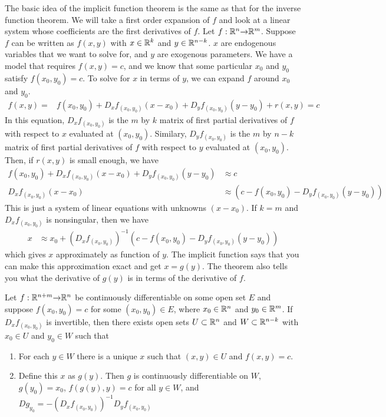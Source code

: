 The basic idea of the implicit function theorem is the same as that
for the inverse function theorem. We will take a first order expansion
of $f$ and look at a linear system whose coefficients are the first
derivatives of $f$. Let $f: \mathbb{R}^n {\rightarrow} \mathbb{R}^m$. Suppose $f$ can be written
as $f(x,y)$ with $x \in \mathbb{R}^k$ and $y \in \mathbb{R}^{n-k}$. $x$ are endogenous
variables that we want to solve for, and $y$ are exogenous
parameters. We have a model that requires $f(x,y) = c$, and we know
that some particular $x_0$ and $y_0$ satisfy $f(x_0,y_0) = c$. To
solve for $x$ in terms of $y$, we can expand $f$ around $x_0$ and
$y_0$. 
\begin{align*}
  f(x,y) = & f(x_0,y_0) + D_xf_{(x_0,y_0)} (x-x_0) + D_yf_{(x_0,y_0)}
  (y-y_0) + r(x,y) = c 
\end{align*}
In this equation, $D_xf_{(x_0,y_0)}$ is the $m$ by $k$ matrix of first
partial derivatives of $f$ with respect to $x$ evaluated at
$(x_0,y_0)$. Similary,  $D_yf_{(x_0,y_0)}$ is the $m$ by $n-k$ matrix of first
partial derivatives of $f$ with respect to $y$ evaluated at
$(x_0,y_0)$.  Then, if $r(x,y)$ is small enough, we have
\begin{align*}
  f(x_0,y_0) + D_xf_{(x_0,y_0)} (x-x_0) + D_yf_{(x_0,y_0)}
 (y-y_0) & \approx c \\
 D_xf_{(x_0,y_0)} (x-x_0) & \approx \left(c -  f(x_0,y_0) -
   D_yf_{(x_0,y_0)} (y-y_0)\right) 
\end{align*}
This is just a system of linear equations with unknowns $(x-x_0)$. If
$k=m$ and $D_xf_{(x_0,y_0)}$ is nonsingular, then we have
\begin{align*}
  x & \approx x_0 + \left(D_x f_{(x_0,y_0)}\right)^{-1} \left(c -  f(x_0,y_0) -
   D_yf_{(x_0,y_0)} (y-y_0)\right) 
\end{align*}
which gives $x$ approximately as function of $y$. The implicit
function says that you can make this approximation exact and get
$x=g(y)$. The theorem also tells you what the derivative of $g(y)$ is
in terms of the derivative of $f$.
\begin{theorem}\label{thm:implicit}
  Let $f:\mathbb{R}^{n+m} {\rightarrow} \mathbb{R}^n$ be continuously differentiable on some open
  set $E$ and suppose $f(x_0,y_0) = c$ for some $(x_0,y_0) \in E$,
  where $x_0 \in \mathbb{R}^n$ and $y_0 \in \mathbb{R}^m$. If 
  $D_xf_{(x_0,y_0)}$ is invertible, then there exists open sets $U
  \subset \mathbb{R}^n$ and $W \subset \mathbb{R}^{n-k}$ with $x_0 \in U$ and
  $y_0 \in W$ such that 
  \begin{enumerate}
  \item\label{imp1} 
    For each $y\in W$ there is a unique $x$ such that $(x,y) \in
    U$ and $f(x,y) = c$.
  \item\label{imp2}
    Define this $x$ as $g(y)$. Then $g$ is continuously
    differentiable on $W$, $g(y_0) = x_0$,
    $f(g(y),y) = c$ for all $y
    \in W$, and $Dg_{y_0} = -\left(D_xf_{(x_0,y_0)}\right)^{-1}
    D_yf_{(x_0,y_0)}$ 
  \end{enumerate}
\end{theorem}
